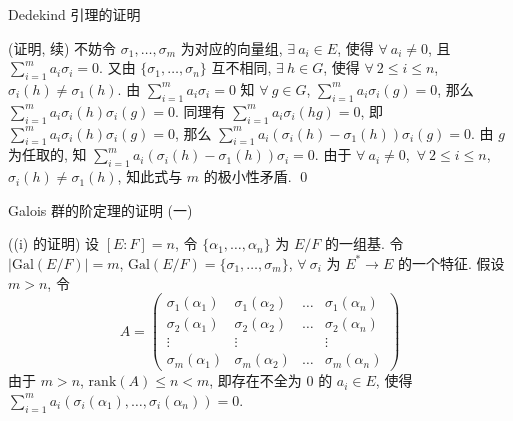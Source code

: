 \begin{frame}{Dedekind 引理的证明}

\startproof[bg=yellow, fg=red](证明, 续)
不妨令 $\sigma_1, \dots, \sigma_m$ 为对应的向量组,
$\exists\ a_i \in E$, 使得 $\forall\ a_i \neq 0$,
且 $\sum_{i=1}^{m} a_i \sigma_i = 0$.
又由 $\{ \sigma_1, \dots, \sigma_n \}$ 互不相同,
$\exists\ h \in G$, 使得 $\forall\ 2 \leq i \leq n$, $\sigma_i(h) \neq \sigma_1(h)$.
由 $\sum_{i=1}^{m} a_i \sigma_i = 0$ 知 $\forall\ g \in G$,
$\sum_{i=1}^{m} a_i \sigma_i(g) = 0$,
那么 $\sum_{i=1}^{m} a_i \sigma_i(h) \sigma_i(g) = 0$.
同理有 $\sum_{i=1}^{m} a_i \sigma_i(hg) = 0$,
即 $\sum_{i=1}^{m} a_i \sigma_i(h) \sigma_i(g) = 0$,
那么 $\sum_{i=1}^{m} a_i (\sigma_i(h) - \sigma_1(h)) \sigma_i(g) = 0$.
由 $g$ 为任取的, 知 $\sum_{i=1}^{m} a_i (\sigma_i(h) - \sigma_1(h)) \sigma_i = 0$.
由于 $\forall\ a_i \neq 0$,\ $\forall\ 2 \leq i \leq n$,
$\sigma_i(h) \neq \sigma_1(h)$,
知此式与 $m$ 的极小性矛盾.
\qed

\end{frame}


\begin{frame}{Galois 群的阶定理的证明 (一)}

\startproof[bg=yellow, fg=red]((i) 的证明)
设 $[E:F] = n$, 令 $\{ \alpha_1, \dots, \alpha_n \}$ 为 $E/F$ 的一组基.
令 $|\mathrm{Gal}(E/F)| = m$, $\mathrm{Gal}(E/F) = \{ \sigma_1, \dots, \sigma_m \}$,
$\forall\ \sigma_i$ 为 $E^{*} \to E$ 的一个特征.
假设 $m > n$, 令
\[
A =
\begin{pmatrix}
\sigma_1(\alpha_1) & \sigma_1(\alpha_2) & \dots & \sigma_1(\alpha_n) \\
\sigma_2(\alpha_1) & \sigma_2(\alpha_2) & \dots & \sigma_2(\alpha_n) \\
\vdots            & \vdots            &       & \vdots            \\
\sigma_m(\alpha_1) & \sigma_m(\alpha_2) & \dots & \sigma_m(\alpha_n)
\end{pmatrix}
\]
由于 $m > n$, $\mathrm{rank}(A) \leq n < m$,
即存在不全为 $0$ 的 $a_i \in E$,
使得 $\sum_{i=1}^{m} a_i (\sigma_i(\alpha_1), \dots, \sigma_i(\alpha_n)) = 0$.

\end{frame}


